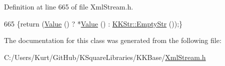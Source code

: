 Definition at line 665 of file Xml\+Stream.\+h.


\begin{DoxyCode}
665 \{\textcolor{keywordflow}{return}  (\hyperlink{class_k_k_b_1_1_xml_element_template_a3d671b57251b4b256fecb2197fc4a0f4}{Value} () ? *\hyperlink{class_k_k_b_1_1_xml_element_template_a3d671b57251b4b256fecb2197fc4a0f4}{Value} () : \hyperlink{class_k_k_b_1_1_k_k_str_ab6e416b3ef54ef632bd10c3f7a2f7994}{KKStr::EmptyStr} ());\}
\end{DoxyCode}


The documentation for this class was generated from the following file\+:\begin{DoxyCompactItemize}
\item 
C\+:/\+Users/\+Kurt/\+Git\+Hub/\+K\+Square\+Libraries/\+K\+K\+Base/\hyperlink{_xml_stream_8h}{Xml\+Stream.\+h}\end{DoxyCompactItemize}
